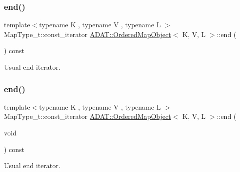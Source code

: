 \subsubsection{\texorpdfstring{end()}{end()}\hspace{0.1cm}{\footnotesize\ttfamily [1/2]}}
{\footnotesize\ttfamily template$<$typename K , typename V , typename L $>$ \\
Map\+Type\+\_\+t\+::const\+\_\+iterator \mbox{\hyperlink{classADAT_1_1OrderedMapObject}{A\+D\+A\+T\+::\+Ordered\+Map\+Object}}$<$ K, V, L $>$\+::end (\begin{DoxyParamCaption}{ }\end{DoxyParamCaption}) const\hspace{0.3cm}{\ttfamily [inline]}}



Usual end iterator. 

\mbox{\label{classADAT_1_1OrderedMapObject_ae6ad157b81bdf303beaee4422f313ed4}} 
\subsubsection{\texorpdfstring{end()}{end()}\hspace{0.1cm}{\footnotesize\ttfamily [2/2]}}
{\footnotesize\ttfamily template$<$typename K , typename V , typename L $>$ \\
Map\+Type\+\_\+t\+::const\+\_\+iterator \mbox{\hyperlink{classADAT_1_1OrderedMapObject}{A\+D\+A\+T\+::\+Ordered\+Map\+Object}}$<$ K, V, L $>$\+::end (\begin{DoxyParamCaption}\item[{void}]{ }\end{DoxyParamCaption}) const\hspace{0.3cm}{\ttfamily [inline]}}



Usual end iterator. 

\mbox{\label{classADAT_1_1OrderedMapObject_af5d9aad7f7a1ce462dfed9cbe13c638c}} 
